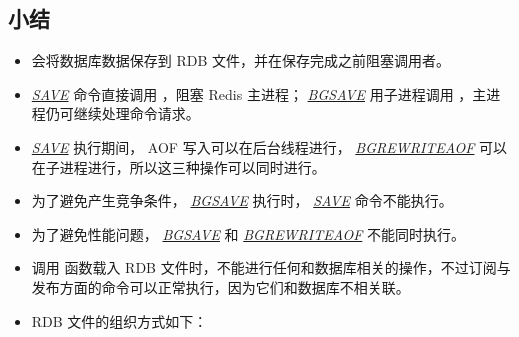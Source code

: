 \documentclass[a4paper,11pt,english]{sphinxmanual}
\begin{document}
\subsection{小结}
\label{internal/rdb:id5}\begin{itemize}
\item {} 
 会将数据库数据保存到 RDB 文件，并在保存完成之前阻塞调用者。

\item {} 
\href{http://redis.readthedocs.org/en/latest/server/save.html\#save}{\emph{SAVE}} 命令直接调用  ，阻塞 Redis 主进程； \href{http://redis.readthedocs.org/en/latest/server/bgsave.html\#bgsave}{\emph{BGSAVE}} 用子进程调用  ，主进程仍可继续处理命令请求。

\item {} 
\href{http://redis.readthedocs.org/en/latest/server/save.html\#save}{\emph{SAVE}} 执行期间， AOF 写入可以在后台线程进行， \href{http://redis.readthedocs.org/en/latest/server/bgrewriteaof.html\#bgrewriteaof}{\emph{BGREWRITEAOF}} 可以在子进程进行，所以这三种操作可以同时进行。

\item {} 
为了避免产生竞争条件， \href{http://redis.readthedocs.org/en/latest/server/bgsave.html\#bgsave}{\emph{BGSAVE}} 执行时， \href{http://redis.readthedocs.org/en/latest/server/save.html\#save}{\emph{SAVE}} 命令不能执行。

\item {} 
为了避免性能问题， \href{http://redis.readthedocs.org/en/latest/server/bgsave.html\#bgsave}{\emph{BGSAVE}} 和 \href{http://redis.readthedocs.org/en/latest/server/bgrewriteaof.html\#bgrewriteaof}{\emph{BGREWRITEAOF}} 不能同时执行。

\item {} 
调用  函数载入 RDB 文件时，不能进行任何和数据库相关的操作，不过订阅与发布方面的命令可以正常执行，因为它们和数据库不相关联。

\item {} 
RDB 文件的组织方式如下：


\end{itemize}
\end{document}
